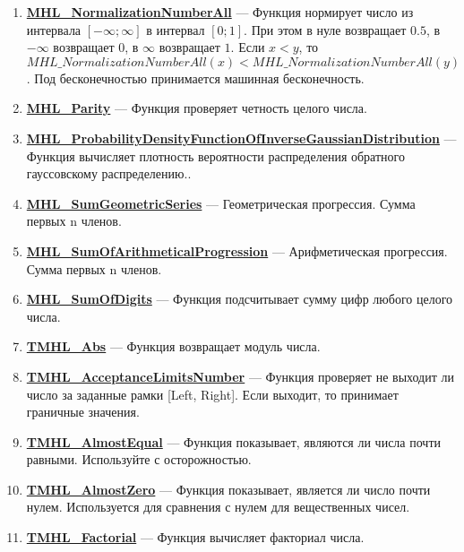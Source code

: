 \documentclass[a4paper,12pt]{article}
\begin{document}
\begin{enumerate}
\item \textbf{\hyperref[MHL_NormalizationNumberAll]{MHL\_NormalizationNumberAll}} --- Функция нормирует число из интервала $\left[-\infty;\infty \right] $ в интервал $\left[0;1\right]$. При этом в нуле возвращает $0.5$, в $-\infty$ возвращает $0$, в $\infty$ возвращает $1$. Если $x<y$, то $MHL\_NormalizationNumberAll(x)<MHL\_NormalizationNumberAll(y)$. Под бесконечностью принимается машинная бесконечность.

\item \textbf{\hyperref[MHL_Parity]{MHL\_Parity}} --- Функция проверяет четность целого числа.

\item \textbf{\hyperref[MHL_ProbabilityDensityFunctionOfInverseGaussianDistribution]{MHL\_ProbabilityDensityFunctionOfInverseGaussianDistribution}} --- Функция вычисляет плотность вероятности распределения обратного гауссовскому распределению..

\item \textbf{\hyperref[MHL_SumGeometricSeries]{MHL\_SumGeometricSeries}} --- Геометрическая прогрессия. Сумма первых n членов.

\item \textbf{\hyperref[MHL_SumOfArithmeticalProgression]{MHL\_SumOfArithmeticalProgression}} --- Арифметическая прогрессия. Сумма первых n членов.

\item \textbf{\hyperref[MHL_SumOfDigits]{MHL\_SumOfDigits}} --- Функция подсчитывает сумму цифр любого целого числа.

\item \textbf{\hyperref[TMHL_Abs]{TMHL\_Abs}} --- Функция возвращает модуль числа.

\item \textbf{\hyperref[TMHL_AcceptanceLimitsNumber]{TMHL\_AcceptanceLimitsNumber}} --- Функция проверяет не выходит ли число за заданные рамки [Left, Right]. Если выходит, то принимает граничные значения.

\item \textbf{\hyperref[TMHL_AlmostEqual]{TMHL\_AlmostEqual}} --- Функция показывает, являются ли числа почти равными. Используйте с осторожностью.

\item \textbf{\hyperref[TMHL_AlmostZero]{TMHL\_AlmostZero}} --- Функция показывает, является ли число почти нулем. Используется для сравнения с нулем для вещественных чисел.

\item \textbf{\hyperref[TMHL_Factorial]{TMHL\_Factorial}} --- Функция вычисляет факториал числа.


\end{enumerate}
\end{document}
